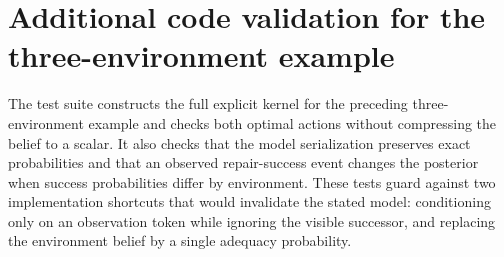 \section{Additional code validation for the three-environment example}
The test suite constructs the full explicit kernel for the preceding
three-environment example and checks both optimal actions without compressing
the belief to a scalar. It also checks that the model serialization preserves
exact probabilities and that an observed repair-success event changes the
posterior when success probabilities differ by environment. These tests guard
against two implementation shortcuts that would invalidate the stated model:
conditioning only on an observation token while ignoring the visible successor,
and replacing the environment belief by a single adequacy probability.
